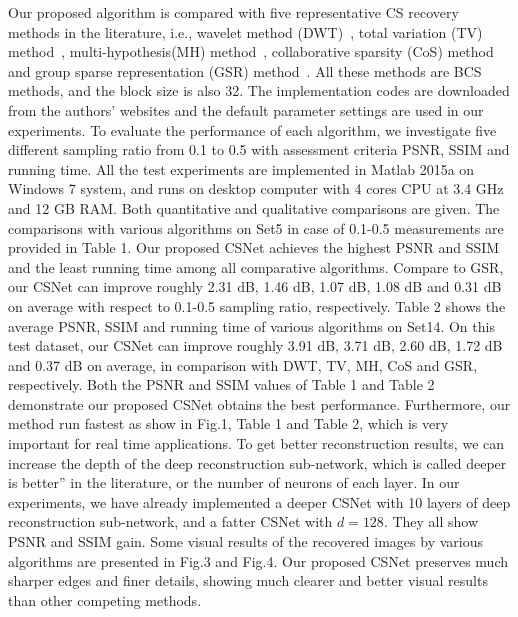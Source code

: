 \documentclass[5pt]{article}
\begin{document}
Our proposed algorithm is compared with five representative CS recovery methods in the literature, i.e., wavelet method (DWT)~\cite{rf27}, total variation (TV) method~\cite{rf7}, multi-hypothesis(MH) method~\cite{rf10}, collaborative sparsity (CoS) method~\cite{rf28} and group sparse representation (GSR) method~\cite{rf11}. All these methods are BCS methods, and the block size is also 32. The implementation codes are downloaded from the authors’ websites and the default parameter settings are used in our experiments. To evaluate the performance of each algorithm, we investigate five different sampling ratio from 0.1 to 0.5 with assessment criteria PSNR, SSIM and running time. All the test experiments are implemented in Matlab 2015a on Windows 7 system, and runs on desktop computer with 4 cores CPU at 3.4 GHz and 12 GB RAM. Both quantitative and qualitative comparisons are given. The comparisons with various algorithms on Set5 in case of 0.1-0.5 measurements are provided in Table 1. Our proposed CSNet achieves the highest PSNR and SSIM and the least running time among all comparative algorithms. Compare to GSR, our CSNet can improve roughly 2.31 dB, 1.46 dB, 1.07 dB, 1.08 dB and 0.31 dB on average with respect to 0.1-0.5 sampling ratio, respectively. Table 2 shows the average PSNR, SSIM and running time of various algorithms on Set14. On this test dataset, our CSNet can improve roughly 3.91 dB, 3.71 dB, 2.60 dB, 1.72 dB and 0.37 dB on average, in comparison with DWT, TV, MH, CoS and GSR, respectively. Both the PSNR and SSIM values of Table 1 and Table 2 demonstrate our proposed CSNet obtains the best performance. Furthermore, our method run fastest as show in Fig.1, Table 1 and Table 2, which is very important for real time applications. To get better reconstruction results, we can increase the depth of the deep reconstruction sub-network, which is called deeper is better” in the literature, or the number of neurons of each layer. In our experiments, we have already implemented a deeper CSNet with 10 layers of deep reconstruction sub-network, and a fatter CSNet with $d = 128$. They all show PSNR and SSIM gain. Some visual results of the recovered images by various algorithms are presented in Fig.3 and Fig.4. Our proposed CSNet preserves much sharper edges and finer details, showing much clearer and better visual results than other competing methods.
\end{document}
